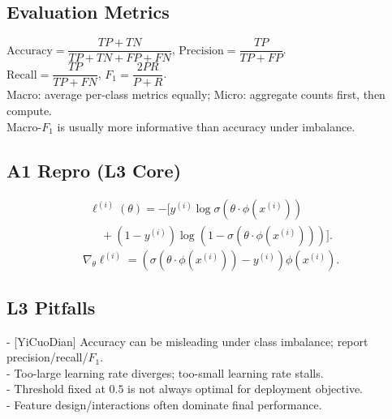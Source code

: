\subsection*{Evaluation Metrics}
$\text{Accuracy}=\dfrac{TP+TN}{TP+TN+FP+FN}$, $\text{Precision}=\dfrac{TP}{TP+FP}$.\\
$\text{Recall}=\dfrac{TP}{TP+FN}$, $F_1=\dfrac{2PR}{P+R}$.\\
Macro: average per-class metrics equally; Micro: aggregate counts first, then compute.\\
Macro-$F_1$ is usually more informative than accuracy under imbalance.

\subsection*{A1 Repro (L3 Core)}
\[
\begin{array}{l}
\ell^{(i)}(\theta)= -\Big[
 y^{(i)}\log\sigma(\theta\cdot\phi(x^{(i)}))\\
\quad +(1-y^{(i)})\log\!\left(1-\sigma(\theta\cdot\phi(x^{(i)}))\right)
\Big].
\end{array}
\]
\[
\nabla_\theta\ell^{(i)}=
\left(\sigma(\theta\cdot\phi(x^{(i)}))-y^{(i)}\right)\phi(x^{(i)}).
\]
\subsection*{L3 Pitfalls}
- [YiCuoDian] Accuracy can be misleading under class imbalance; report precision/recall/$F_1$.\\
- Too-large learning rate diverges; too-small learning rate stalls.\\
- Threshold fixed at $0.5$ is not always optimal for deployment objective.\\
- Feature design/interactions often dominate final performance.
